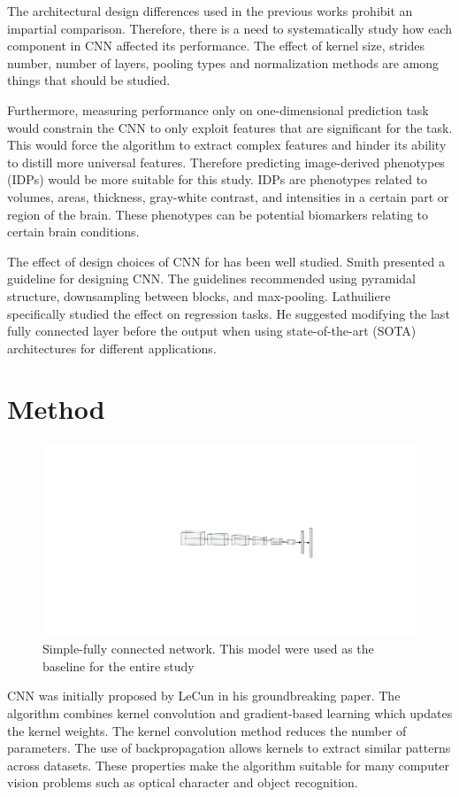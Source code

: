 \documentclass{article}
\begin{document}
    The architectural design differences used in the previous works prohibit an impartial comparison. 
    Therefore, there is a need to systematically study how each component in CNN affected its performance. 
    The effect of kernel size, strides number, number of layers, pooling types and normalization methods are among things that should be studied.

    Furthermore, measuring performance only on one-dimensional prediction task would constrain the CNN to only exploit features that are significant for the task. 
    This would force the algorithm to extract complex features and hinder its ability to distill more universal features. 
    Therefore predicting image-derived phenotypes (IDPs) would be more suitable for this study. 
    IDPs are phenotypes related to volumes, areas, thickness, gray-white contrast, and intensities in a certain part or region of the brain. 
    These phenotypes can be potential biomarkers relating to certain brain conditions. 
    
    The effect of design choices of CNN for has been well studied. 
    Smith\cite{smith} presented a guideline for designing CNN. 
    The guidelines recommended using pyramidal structure, downsampling between blocks, and max-pooling. 
    Lathuiliere\cite{lath} specifically studied the effect on regression tasks. 
    He suggested modifying the last fully connected layer before the output when using state-of-the-art (SOTA) architectures for different applications.
    

    \section*{Method}
    \begin{figure}[h]
        \centering
        \includegraphics[scale=0.8]{nn}
        \centering
        \caption{Simple-fully connected network. This model were used as the baseline for the entire study}
        \label{fig:sfcn}
    \end{figure}
    CNN was initially proposed by LeCun\cite{lecun} in his groundbreaking paper. 
    The algorithm combines kernel convolution and gradient-based learning which updates the kernel weights. 
    The kernel convolution method reduces the number of parameters. 
    The use of backpropagation allows kernels to extract similar patterns across datasets. 
    These properties make the algorithm suitable for many computer vision problems such as optical character and object recognition.
\end{document}
